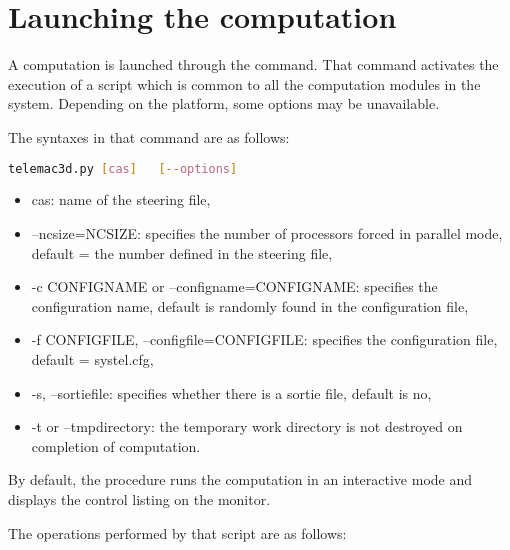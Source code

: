 \chapter{Launching the computation}

A computation is launched through the  command.
That command activates the execution of a script which is common to all the
computation modules in the \tel system.
Depending on the platform, some options may be unavailable.

The syntaxes in that command are as follows:

\begin{lstlisting}[language=bash]
telemac3d.py [cas]   [--options]
\end{lstlisting}

\begin{itemize}
\item cas: name of the steering file,

\item --ncsize=NCSIZE: specifies the number of processors forced in parallel
mode, default = the number defined in the steering file,

\item -c CONFIGNAME or --configname=CONFIGNAME: specifies the configuration
name, default is randomly found in the configuration file,

\item -f CONFIGFILE, --configfile=CONFIGFILE: specifies the configuration
file, default = systel.cfg,

\item -s, --sortiefile: specifies whether there is a sortie file, default is
no,

\item -t or --tmpdirectory: the temporary work directory is not destroyed on
completion of computation.
\end{itemize}

By default, the procedure runs the computation in an interactive mode and
displays the control listing on the monitor.

The operations performed by that script are as follows:

